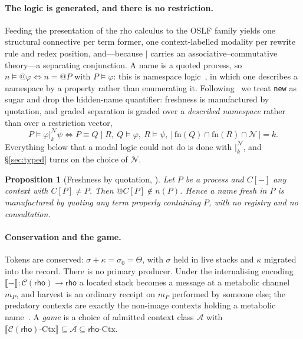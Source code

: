 \documentclass[11pt,a4paper]{article}
\theoremstyle{plain}
\newtheorem{proposition}[theorem]{Proposition}
\theoremstyle{definition}
\theoremstyle{remark}
\newcommand{\rt}{\mathsf{rho}}
\newcommand{\Ctx}{\mathrm{Ctx}}
\newcommand{\Nsp}{\mathcal{N}}
\newcommand{\sep}[2]{\mathbin{\big|^{#1}_{#2}}}
\newcommand{\fn}{\mathrm{fn}}
\begin{document}
\paragraph{The logic is generated, and there is no restriction.}
Feeding the presentation of the rho calculus to the OSLF family yields one structural connective
per term former, one context-labelled modality per rewrite rule and redex position, and---because
$\mid$ carries an associative--commutative theory---a separating conjunction. A name is a quoted
process, so $n \models @\varphi \iff n = @P$ with $P \models \varphi$: this is namespace
logic~\cite{nslogic}, in which one describes a namespace by a property rather than enumerating
it. Following~\cite[\S2]{game} we treat \texttt{new} as sugar and drop the hidden-name
quantifier: freshness is manufactured by quotation, and graded separation is graded over a
\emph{described namespace} rather than over a restriction vector,
\[
  P \models \varphi \sep{\Nsp}{k} \psi
  \iff
  P \equiv Q \mid R,\ Q \models \varphi,\ R \models \psi,\
  \bigl|\, \fn(Q) \cap \fn(R) \cap \Nsp \,\bigr| = k .
\]
Everything below that a modal logic could not do is done with $\sep{\Nsp}{k}$, and
\S\ref{sec:typed} turns on the choice of $\Nsp$.

\begin{proposition}[Freshness by quotation, {\cite[Prop.~2]{game}}]\label{prop:fresh}
Let $P$ be a process and $C[-]$ any context with $C[P] \neq P$. Then $@C[P] \notin n(P)$. Hence a
name fresh in $P$ is manufactured by quoting any term properly containing $P$, with no registry
and no consultation.
\end{proposition}

\paragraph{Conservation and the game.}
Tokens are conserved: $\sigma + \kappa = \sigma_0 = \Theta$, with $\sigma$ held in live stacks
and $\kappa$ migrated into the record. There is no primary producer. Under the internalising
encoding $\llbracket - \rrbracket : \mathcal{C}(\rt) \to \rt$ a located stack becomes a message
at a metabolic channel $m_P$, and harvest is an ordinary receipt on $m_P$ performed by someone
else; the predatory contexts are exactly the non-image contexts holding a metabolic
name~\cite[Thm.~25]{scientist}. A \emph{game} is a choice of admitted context class $\mathcal{A}$
with $\llbracket \mathcal{C}(\rt)\text{-}\Ctx \rrbracket \subseteq \mathcal{A} \subseteq
\rt\text{-}\Ctx$.
\end{document}
